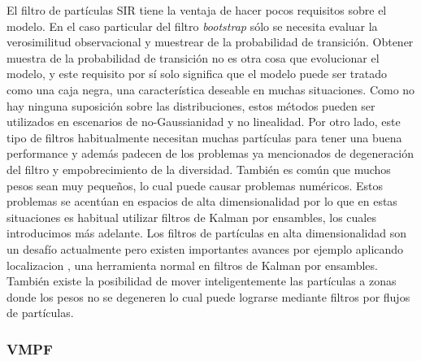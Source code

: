 El filtro de partículas SIR tiene la ventaja de hacer pocos requisitos sobre el modelo. En el caso particular del filtro \textit{bootstrap} sólo se necesita evaluar la verosimilitud observacional y muestrear de la probabilidad de transición. Obtener muestra de la probabilidad de transición no es otra cosa que evolucionar el modelo, y este requisito por sí solo significa que el modelo puede ser tratado como una caja negra, una característica deseable en muchas situaciones. Como no hay ninguna suposición sobre las distribuciones, estos métodos pueden ser utilizados en escenarios de no-Gaussianidad y no linealidad. Por otro lado, este tipo de filtros habitualmente necesitan muchas partículas para tener una buena performance y además padecen de los problemas ya mencionados de degeneración del filtro y empobrecimiento de la diversidad. También es común que muchos pesos sean muy pequeños, lo cual puede causar problemas numéricos. Estos problemas se acentúan en espacios de alta dimensionalidad por lo que en estas situaciones es habitual utilizar filtros de Kalman por ensambles, los cuales introducimos más adelante. Los filtros de partículas en alta dimensionalidad son un desafío actualmente pero existen importantes avances por ejemplo aplicando localizacion \citep{Vossepoel2007}, una herramienta normal en filtros de Kalman por ensambles. También existe la posibilidad de mover inteligentemente las partículas a zonas donde los pesos no se degeneren lo cual puede lograrse mediante filtros por flujos de partículas.

\subsubsection{VMPF}

